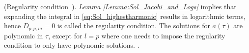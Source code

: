 \begin{remark}\label{Remark:logfreeRemark}(Regularity condition~\cite{MinMacKro22}).
  \emph{Lemma \ref{Lemma:Sol_Jacobi_and_Logs}} implies that expanding the integral in \eqref{eq:Sol_highestharmonic} results in logarithmic terms, hence
  $D_{p,p,m} = 0$ is called the regularity condition. The solutions for
  $a(\tau)$ are polynomic in $\tau$, except for $l = p$ where one needs
  to impose the regularity condition to only have polynomic
  solutions. \cite{MinMacKro22}.
\end{remark}
